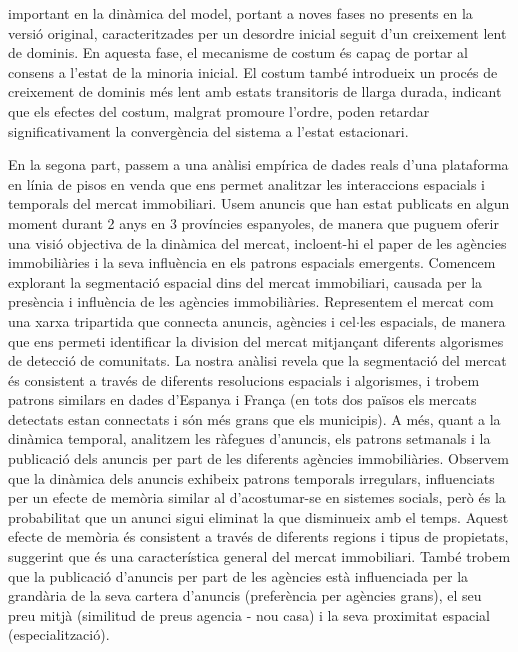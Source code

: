 important en la dinàmica del model, portant a noves fases no presents en la versió original, caracteritzades per un desordre inicial seguit d'un creixement lent de dominis. En aquesta fase, el mecanisme de costum és capaç de portar al consens a l'estat de la minoria inicial. El costum també introdueix un procés de creixement de dominis més lent amb estats transitoris de llarga durada, indicant que els efectes del costum, malgrat promoure l'ordre, poden retardar significativament la convergència del sistema a l'estat estacionari.

En la segona part, passem a una anàlisi empírica de dades reals d'una plataforma en línia de pisos en venda que ens permet analitzar les interaccions espacials i temporals del mercat immobiliari. Usem anuncis que han estat publicats en algun moment durant 2 anys en 3 províncies espanyoles, de manera que puguem oferir una visió objectiva de la dinàmica del mercat, incloent-hi el paper de les agències immobiliàries i la seva influència en els patrons espacials emergents. Comencem explorant la segmentació espacial dins del mercat immobiliari, causada per la presència i influència de les agències immobiliàries. Representem el mercat com una xarxa tripartida que connecta anuncis, agències i cel$\cdot$les espacials, de manera que ens permeti identificar la division del mercat mitjançant diferents algorismes de detecció de comunitats. La nostra anàlisi revela que la segmentació del mercat és consistent a través de diferents resolucions espacials i algorismes, i trobem patrons similars en dades d'Espanya i França (en tots dos països els mercats detectats estan connectats i són més grans que els municipis). A més, quant a la dinàmica temporal, analitzem les ràfegues d'anuncis, els patrons setmanals i la publicació dels anuncis per part de les diferents agències immobiliàries. Observem que la dinàmica dels anuncis exhibeix patrons temporals irregulars, influenciats per un efecte de memòria similar al d'acostumar-se en sistemes socials, però és la probabilitat que un anunci sigui eliminat la que disminueix amb el temps. Aquest efecte de memòria és consistent a través de diferents regions i tipus de propietats, suggerint que és una característica general del mercat immobiliari. També trobem que la publicació d'anuncis per part de les agències està influenciada per la grandària de la seva cartera d'anuncis (preferència per agències grans), el seu preu mitjà (similitud de preus agencia - nou casa) i la seva proximitat espacial (especialització).

\thispagestyle{empty}

